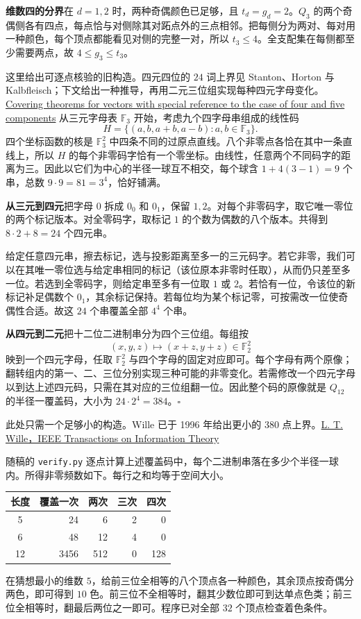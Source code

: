 \documentclass[11pt,a4paper]{article}
\newcommand{\sect}[1]{\par\vspace{4pt}{\large\sffamily\bfseries\color{accent}#1}\par}
\newcommand{\subh}[1]{\par\textbf{#1}\quad}
\newcommand{\F}{\mathbb F}
\newcommand{\finish}{\hfill$\square$}
\begin{document}
\subh{维数四的分界}在 $d=1,2$ 时，两种奇偶颜色已足够，且 $t_d=g_d=2$。$Q_3$ 的两个奇偶侧各有四点，每点恰与对侧除其对跖点外的三点相邻。把每侧分为两对、每对用一种颜色，每个顶点都能看见对侧的完整一对，所以 $t_3\le4$。全支配集在每侧都至少需要两点，故 $4\le g_3\le t_3$。

\newpage
\sect{十二位覆盖码的构造}
这里给出可逐点核验的旧构造。四元四位的 $24$ 词上界见 Stanton、Horton 与 Kalbfleisch；下文给出一种推导，再用二元三位组实现每种四元字母变化。\href{https://doi.org/10.1112/jlms/s2-1.1.493}{Covering theorems for vectors with special reference to the case of four and five components}
从三元字母表 $\F_3$ 开始，考虑九个四字母串组成的线性码
\[
               H=\{(a,b,a+b,a-b):a,b\in\F_3\}.
\]
四个坐标函数的核是 $\F_3^2$ 中四条不同的过原点直线。八个非零点各恰在其中一条直线上，所以 $H$ 的每个非零码字恰有一个零坐标。由线性，任意两个不同码字的距离为三。因此以它们为中心的半径一球互不相交，每个球含 $1+4(3-1)=9$ 个串，总数 $9\cdot9=81=3^4$，恰好铺满。

\subh{从三元到四元}把字母 $0$ 拆成 $0_0$ 和 $0_1$，保留 $1,2$。对每个非零码字，取它唯一零位的两个标记版本。对全零码字，取标记 $1$ 的个数为偶数的八个版本。共得到 $8\cdot2+8=24$ 个四元串。

给定任意四元串，擦去标记，选与投影距离至多一的三元码字。若它非零，我们可以在其唯一零位选与给定串相同的标记（该位原本非零时任取），从而仍只差至多一位。若选到全零码字，则给定串至多有一位取 $1$ 或 $2$。若恰有一位，令该位的新标记补足偶数个 $0_1$，其余标记保持。若每位均为某个标记零，可按需改一位使奇偶性合适。故这 $24$ 个串覆盖全部 $4^4$ 个串。

\subh{从四元到二元}把十二位二进制串分为四个三位组。每组按
\[
                 (x,y,z)\longmapsto(x+z,y+z)\in\F_2^2
\]
映到一个四元字母，任取 $\F_2^2$ 与四个字母的固定对应即可。每个字母有两个原像；翻转组内的第一、二、三位分别实现三种可能的非零变化。若需修改一个四元字母以到达上述四元码，只需在其对应的三位组翻一位。因此整个码的原像就是 $Q_{12}$ 的半径一覆盖码，大小为 $24\cdot2^4=384$。\finish

此处只需一个足够小的构造。Wille 已于 1996 年给出更小的 $380$ 点上界。\href{https://doi.org/10.1109/18.481808}{L. T. Wille，IEEE Transactions on Information Theory}

\sect{小规模独立核验}
随稿的 \texttt{verify.py} 逐点计算上述覆盖码中，每个二进制串落在多少个半径一球内。所得非零频数如下。每行之和均等于空间大小。
\begin{center}
\small\renewcommand{\arraystretch}{1.15}
\begin{tabular}{@{}c r r r r@{}}\toprule
长度 & 覆盖一次 & 两次 & 三次 & 四次\\ \midrule
5 & 24 & 6 & 2 & 0\\
6 & 48 & 12 & 4 & 0\\
12 & 3456 & 512 & 0 & 128\\ \bottomrule
\end{tabular}
\end{center}
在猜想最小的维数 $5$，给前三位全相等的八个顶点各一种颜色，其余顶点按奇偶分两色，即可得到 $10$ 色。前三位不全相等时，翻其少数位即可到达单点色类；前三位全相等时，翻最后两位之一即可。程序已对全部 $32$ 个顶点检查着色条件。
\end{document}
